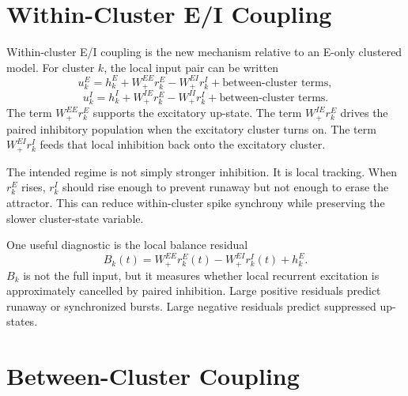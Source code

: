 \section{Within-Cluster E/I Coupling}
\label{sec:within-cluster-ei-coupling}

Within-cluster E/I coupling is the new mechanism relative to an E-only clustered model. For cluster $k$, the local input pair can be written
%
\begin{equation}
  u_k^E
  =
  h_k^E
  +
  W_{+}^{EE}r_k^E
  -
  W_{+}^{EI}r_k^I
  +
  \text{between-cluster terms},
  \label{eq:local-e-input}
\end{equation}
%
\begin{equation}
  u_k^I
  =
  h_k^I
  +
  W_{+}^{IE}r_k^E
  -
  W_{+}^{II}r_k^I
  +
  \text{between-cluster terms}.
  \label{eq:local-i-input}
\end{equation}
%
The term $W_{+}^{EE}r_k^E$ supports the excitatory up-state. The term $W_{+}^{IE}r_k^E$ drives the paired inhibitory population when the excitatory cluster turns on. The term $W_{+}^{EI}r_k^I$ feeds that local inhibition back onto the excitatory cluster.

The intended regime is not simply stronger inhibition. It is local tracking. When $r_k^E$ rises, $r_k^I$ should rise enough to prevent runaway but not enough to erase the attractor. This can reduce within-cluster spike synchrony while preserving the slower cluster-state variable.

One useful diagnostic is the local balance residual
%
\begin{equation}
  B_k(t)
  =
  W_{+}^{EE}r_k^E(t)
  -
  W_{+}^{EI}r_k^I(t)
  +
  h_k^E .
  \label{eq:ch22-local-balance-residual}
\end{equation}
%
$B_k$ is not the full input, but it measures whether local recurrent excitation is approximately cancelled by paired inhibition. Large positive residuals predict runaway or synchronized bursts. Large negative residuals predict suppressed up-states.

\section{Between-Cluster Coupling}
\label{sec:between-cluster-coupling}


